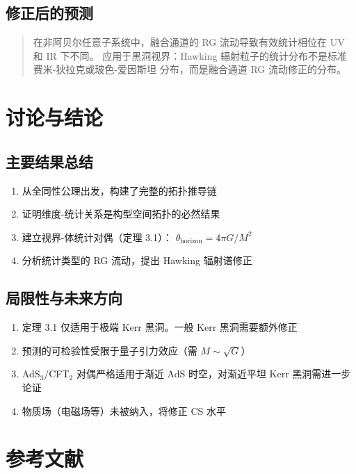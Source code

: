 \documentclass[11pt,a4paper]{article}
\begin{document}
\subsection{修正后的预测}

\begin{quote}
在非阿贝尔任意子系统中，融合通道的 RG 流动导致有效统计相位在 UV 和 IR 下不同。
应用于黑洞视界：Hawking 辐射粒子的统计分布不是标准费米-狄拉克或玻色-爱因斯坦
分布，而是融合通道 RG 流动修正的分布。
\end{quote}

\section{讨论与结论}

\subsection{主要结果总结}

\begin{enumerate}
\item 从全同性公理出发，构建了完整的拓扑推导链
\item 证明维度-统计关系是构型空间拓扑的必然结果
\item 建立视界-体统计对偶（定理 3.1）：
$\theta_{\text{horizon}} = 4\pi G/M^2$
\item 分析统计类型的 RG 流动，提出 Hawking 辐射谱修正
\end{enumerate}

\subsection{局限性与未来方向}

\begin{enumerate}
\item 定理 3.1 仅适用于极端 Kerr 黑洞。一般 Kerr 黑洞需要额外修正
\item 预测的可检验性受限于量子引力效应（需 $M \sim \sqrt{G}$）
\item AdS$_3$/CFT$_2$ 对偶严格适用于渐近 AdS 时空，对渐近平坦 Kerr 黑洞需进一步论证
\item 物质场（电磁场等）未被纳入，将修正 CS 水平
\end{enumerate}

\section{参考文献}
\end{document}
